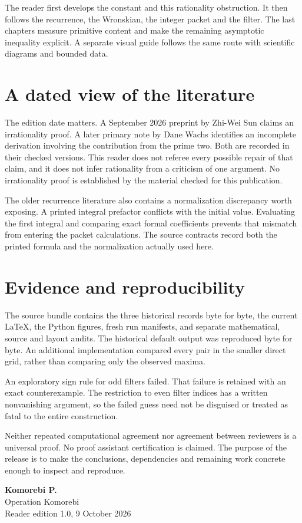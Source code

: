 The reader first develops the constant and this rationality obstruction. It then follows the recurrence, the Wronskian, the integer packet and the filter. The last chapters measure primitive content and make the remaining asymptotic inequality explicit. A separate visual guide follows the same route with scientific diagrams and bounded data.

\section*{A dated view of the literature}
The edition date matters. A September 2026 preprint by Zhi-Wei Sun claims an irrationality proof. A later primary note by Dane Wachs identifies an incomplete derivation involving the contribution from the prime two. Both are recorded in their checked versions. This reader does not referee every possible repair of that claim, and it does not infer rationality from a criticism of one argument. No irrationality proof is established by the material checked for this publication.

The older recurrence literature also contains a normalization discrepancy worth exposing. A printed integral prefactor conflicts with the initial value. Evaluating the first integral and comparing exact formal coefficients prevents that mismatch from entering the packet calculations. The source contracts record both the printed formula and the normalization actually used here.

\section*{Evidence and reproducibility}
The source bundle contains the three historical records byte for byte, the current LaTeX, the Python figures, fresh run manifests, and separate mathematical, source and layout audits. The historical default output was reproduced byte for byte. An additional implementation compared every pair in the smaller direct grid, rather than comparing only the observed maxima.

An exploratory sign rule for odd filters failed. That failure is retained with an exact counterexample. The restriction to even filter indices has a written nonvanishing argument, so the failed guess need not be disguised or treated as fatal to the entire construction.

Neither repeated computational agreement nor agreement between reviewers is a universal proof. No proof assistant certification is claimed. The purpose of the release is to make the conclusions, dependencies and remaining work concrete enough to inspect and reproduce.

\medskip
\noindent\textbf{Komorebi P.}\\
Operation Komorebi\\
Reader edition 1.0, 9 October 2026
